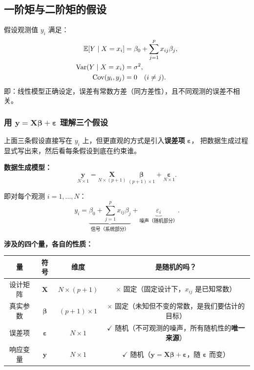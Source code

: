 \subsection{一阶矩与二阶矩的假设}

\begin{definition}[一阶与二阶矩假设]
假设观测值 $y_i$ 满足：
\begin{align}
    \mathbb{E}[Y \mid X = x_i] &= \beta_0 + \sum_{j=1}^{p} x_{ij} \beta_j, \label{eq:mean_assumption} \\
    \mathrm{Var}(Y \mid X = x_i) &= \sigma^2, \label{eq:var_assumption} \\
    \mathrm{Cov}(y_i, y_j) &= 0 \quad (i \neq j). \label{eq:indep_assumption}
\end{align}
即：线性模型正确设定，误差有常数方差（同方差性），且不同观测的误差不相关。
\end{definition}

\subsubsection{用 $\mathbf{y} = \mathbf{X}\bm{\beta} + \bm{\varepsilon}$ 理解三个假设}

上面三条假设直接写在 $y_i$ 上，但更直观的方式是引入\textbf{误差项} $\bm{\varepsilon}$，
把数据生成过程显式写出来，然后看每条假设到底在约束谁。

\medskip
\noindent
\textbf{数据生成模型：}
\begin{equation}\label{eq:data_generating}
    \underset{N \times 1}{\mathbf{y}}
    = \underset{N \times (p+1)}{\mathbf{X}} \;
      \underset{(p+1) \times 1}{\bm{\beta}}
    + \underset{N \times 1}{\bm{\varepsilon}}.
\end{equation}

即对每个观测 $i = 1, \dots, N$：
\[
    y_i = \underbrace{\beta_0 + \sum_{j=1}^{p} x_{ij} \beta_j}_{\text{信号（系统部分）}}
        + \underbrace{\varepsilon_i}_{\text{噪声（随机部分）}}.
\]

\medskip
\noindent
\textbf{涉及的四个量，各自的性质：}

\begin{center}
\renewcommand{\arraystretch}{1.4}
\begin{tabular}{c|c|c|c}
\toprule
\textbf{量} & \textbf{符号} & \textbf{维度} & \textbf{是随机的吗？} \\
\midrule
设计矩阵 & $\mathbf{X}$ & $N \times (p+1)$ & {\scriptsize $\times$} 固定（固定设计下，$x_{ij}$ 是已知常数）\\
真实参数 & $\bm{\beta}$ & $(p+1) \times 1$ & {\scriptsize $\times$} 固定（未知但不变的常数，是我们要估计的目标）\\
误差项   & $\bm{\varepsilon}$ & $N \times 1$ & {\scriptsize $\checkmark$} 随机（不可观测的噪声，所有随机性的\textbf{唯一来源}）\\
响应变量 & $\mathbf{y}$ & $N \times 1$ & {\scriptsize $\checkmark$} 随机（$\mathbf{y} = \mathbf{X}\bm{\beta} + \bm{\varepsilon}$，随 $\bm{\varepsilon}$ 而变）\\
\bottomrule
\end{tabular}
\end{center}

